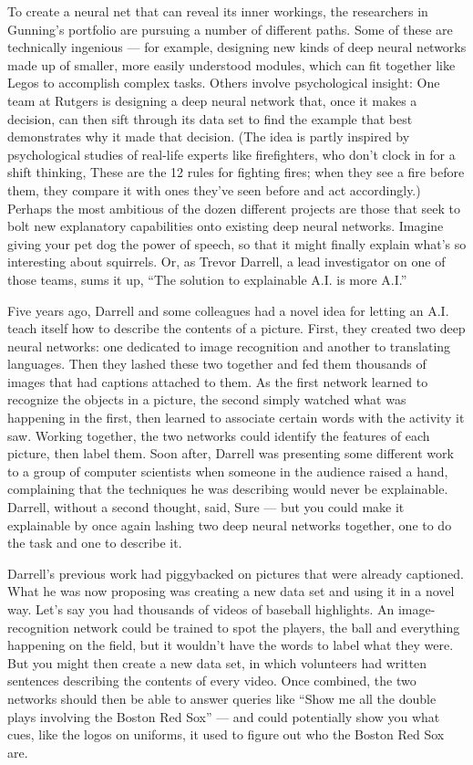 To create a neural net that can reveal its inner workings, the
researchers in Gunning's portfolio are pursuing a number of different
paths. Some of these are technically ingenious --- for example,
designing new kinds of deep neural networks made up of smaller, more
easily understood modules, which can fit together like Legos to
accomplish complex tasks. Others involve psychological insight: One team
at Rutgers is designing a deep neural network that, once it makes a
decision, can then sift through its data set to find the example that
best demonstrates why it made that decision. (The idea is partly
inspired by psychological studies of real-life experts like
firefighters, who don't clock in for a shift thinking, These are the 12
rules for fighting fires; when they see a fire before them, they compare
it with ones they've seen before and act accordingly.) Perhaps the most
ambitious of the dozen different projects are those that seek to bolt
new explanatory capabilities onto existing deep neural networks. Imagine
giving your pet dog the power of speech, so that it might finally
explain what's so interesting about squirrels. Or, as Trevor Darrell, a
lead investigator on one of those teams, sums it up, ``The solution to
explainable A.I. is more A.I.''

Five years ago, Darrell and some colleagues had a novel idea for letting
an A.I. teach itself how to describe the contents of a picture. First,
they created two deep neural networks: one dedicated to image
recognition and another to translating languages. Then they lashed these
two together and fed them thousands of images that had captions attached
to them. As the first network learned to recognize the objects in a
picture, the second simply watched what was happening in the first, then
learned to associate certain words with the activity it saw. Working
together, the two networks could identify the features of each picture,
then label them. Soon after, Darrell was presenting some different work
to a group of computer scientists when someone in the audience raised a
hand, complaining that the techniques he was describing would never be
explainable. Darrell, without a second thought, said, Sure --- but you
could make it explainable by once again lashing two deep neural networks
together, one to do the task and one to describe it.

Darrell's previous work had piggybacked on pictures that were already
captioned. What he was now proposing was creating a new data set and
using it in a novel way. Let's say you had thousands of videos of
baseball highlights. An image-recognition network could be trained to
spot the players, the ball and everything happening on the field, but it
wouldn't have the words to label what they were. But you might then
create a new data set, in which volunteers had written sentences
describing the contents of every video. Once combined, the two networks
should then be able to answer queries like ``Show me all the double
plays involving the Boston Red Sox'' --- and could potentially show you
what cues, like the logos on uniforms, it used to figure out who the
Boston Red Sox are.

